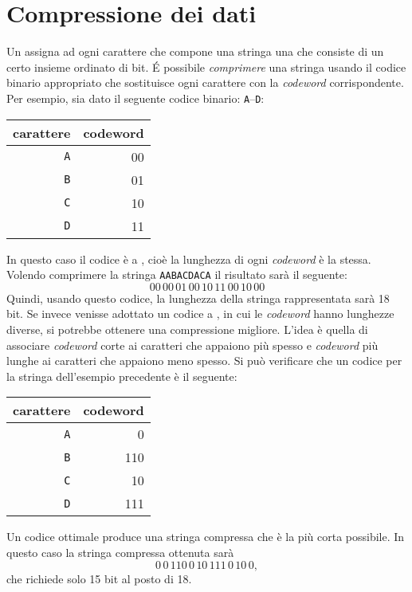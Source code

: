 \section{Compressione dei dati}


Un  assigna ad ogni carattere
che compone una stringa una  che consiste 
di un certo insieme ordinato di bit.
\'{E} possibile \emph{comprimere} una stringa usando il codice 
binario appropriato che sostituisce ogni carattere con la 
\emph{codeword} corrispondente.
Per esempio, sia dato il seguente codice binario:
\texttt{A}–\texttt{D}:
\begin{center}
\begin{tabular}{rr}
carattere & codeword \\
\hline
\texttt{A} & 00 \\
\texttt{B} & 01 \\
\texttt{C} & 10 \\
\texttt{D} & 11 \\
\end{tabular}
\end{center}
In questo caso il codice è a ,
cioè la lunghezza di ogni \emph{codeword} è la stessa.
Volendo comprimere la stringa
\texttt{AABACDACA} il risultato sarà il seguente:
\[00\,00\,01\,00\,10\,11\,00\,10\,00\]
Quindi, usando questo codice, la lunghezza della
stringa rappresentata sarà 18 bit.
Se invece venisse adottato un codice a 
, in cui le \emph{codeword}
hanno lunghezze diverse, si potrebbe ottenere
una compressione migliore.
L'idea è quella di associare \emph{codeword} corte
ai caratteri che appaiono più spesso e 
\emph{codeword} più lunghe ai caratteri che 
appaiono meno spesso.
Si può verificare che un codice 
per la stringa dell'esempio precedente 
è il seguente:
\begin{center}
\begin{tabular}{rr}
carattere & codeword \\
\hline
\texttt{A} & 0 \\
\texttt{B} & 110 \\
\texttt{C} & 10 \\
\texttt{D} & 111 \\
\end{tabular}
\end{center}
Un codice ottimale produce una stringa compressa
che è la più corta possibile.
In questo caso la stringa compressa ottenuta sarà
\[0\,0\,110\,0\,10\,111\,0\,10\,0,\]
che richiede solo 15 bit al posto di 18.

